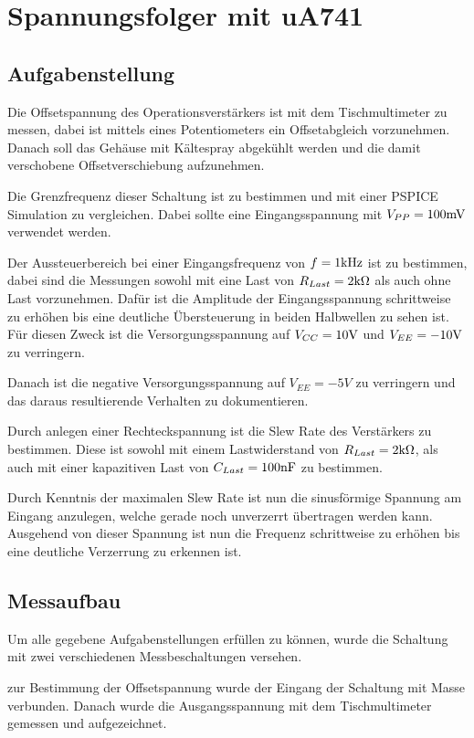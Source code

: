 \section{Spannungsfolger mit uA741}
\subsection{Aufgabenstellung}
Die Offsetspannung des Operationsverstärkers ist mit dem Tischmultimeter zu messen, dabei ist mittels eines Potentiometers ein Offsetabgleich vorzunehmen. Danach soll das Gehäuse mit Kältespray abgekühlt werden und die damit verschobene Offsetverschiebung aufzunehmen. 

Die Grenzfrequenz dieser Schaltung ist zu bestimmen und mit einer PSPICE Simulation zu vergleichen. Dabei sollte eine Eingangsspannung mit $V_{PP} = 100 \rm mV$ verwendet werden. 

Der Aussteuerbereich bei einer Eingangsfrequenz von $f=1 \rm kHz$ ist zu bestimmen, dabei sind die Messungen sowohl mit eine Last von $R_{Last} = 2 \rm k\Omega$ als auch ohne Last vorzunehmen. Dafür ist die Amplitude der Eingangsspannung schrittweise zu erhöhen bis eine deutliche Übersteuerung in beiden Halbwellen zu sehen ist. Für diesen Zweck ist die Versorgungsspannung auf $V_{CC} = 10\rm V$ und $V_{EE} = -10 \rm V$ zu verringern. 

Danach ist die negative Versorgungsspannung auf $V_{EE} = -5V$ zu verringern und das daraus resultierende Verhalten zu dokumentieren.

Durch anlegen einer Rechteckspannung ist die Slew Rate des Verstärkers zu bestimmen. Diese ist sowohl mit einem Lastwiderstand von $R_{Last} = 2\rm k\Omega$, als auch mit einer kapazitiven Last von $C_{Last} = 100 \rm nF$ zu bestimmen. 

Durch Kenntnis der maximalen Slew Rate ist nun die sinusförmige Spannung am Eingang anzulegen, welche gerade noch unverzerrt übertragen werden kann. Ausgehend von dieser Spannung ist nun die Frequenz schrittweise zu erhöhen bis eine deutliche Verzerrung zu erkennen ist. 

\subsection{Messaufbau}
Um alle gegebene Aufgabenstellungen erfüllen zu können, wurde die Schaltung mit zwei verschiedenen Messbeschaltungen versehen. 

zur Bestimmung der Offsetspannung wurde der Eingang der Schaltung mit Masse verbunden. Danach wurde die Ausgangsspannung mit dem Tischmultimeter gemessen und aufgezeichnet.

